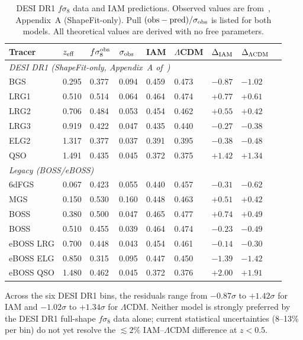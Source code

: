 \documentclass[12pt,a4paper]{article}
\newcommand{\lcdm}{$\Lambda$CDM}
\begin{document}
\begin{table}[ht]
\centering
\caption{DESI DR1 $f\sigma_8$ data and IAM predictions.
Observed values are from~\citet{DESI2024DR1FS}, Appendix~A (ShapeFit-only).
Pull $({\rm obs} - {\rm pred})/\sigma_{\rm obs}$ is listed for both models.
All theoretical values are derived with no free parameters.}
\label{tab:fsig8_full}
\begin{tabular}{lllllllll}
\toprule
Tracer & $z_{\rm eff}$ & $f\sigma_8^{\rm obs}$ & $\sigma_{\rm obs}$
  & IAM & $\Lambda$CDM & $\Delta_{\rm IAM}$ & $\Delta_{\rm \Lambda CDM}$\\
\midrule
\multicolumn{8}{l}{\textit{DESI DR1 (ShapeFit-only, Appendix~A of~\citealt{DESI2024DR1FS})}} \\
BGS   & 0.295 & 0.377 & 0.094 & 0.459 & 0.473 & $-0.87$ & $-1.02$ \\
LRG1  & 0.510 & 0.514 & 0.064 & 0.464 & 0.474 & $+0.77$ & $+0.61$ \\
LRG2  & 0.706 & 0.484 & 0.053 & 0.454 & 0.462 & $+0.55$ & $+0.42$ \\
LRG3  & 0.919 & 0.422 & 0.047 & 0.435 & 0.440 & $-0.27$ & $-0.38$ \\
ELG2  & 1.317 & 0.377 & 0.037 & 0.391 & 0.395 & $-0.38$ & $-0.48$ \\
QSO   & 1.491 & 0.435 & 0.045 & 0.372 & 0.375 & $+1.42$ & $+1.34$ \\
\midrule
\multicolumn{8}{l}{\textit{Legacy (BOSS/eBOSS)}} \\
6dFGS & 0.067 & 0.423 & 0.055 & 0.440 & 0.457 & $-0.31$ & $-0.62$ \\
MGS   & 0.150 & 0.530 & 0.160 & 0.448 & 0.463 & $+0.51$ & $+0.42$ \\
BOSS  & 0.380 & 0.500 & 0.047 & 0.465 & 0.477 & $+0.74$ & $+0.49$ \\
BOSS  & 0.510 & 0.455 & 0.039 & 0.464 & 0.474 & $-0.23$ & $-0.49$ \\
eBOSS LRG & 0.700 & 0.448 & 0.043 & 0.454 & 0.461 & $-0.14$ & $-0.30$ \\
eBOSS ELG & 0.850 & 0.315 & 0.095 & 0.447 & 0.450 & $-1.39$ & $-1.42$ \\
eBOSS QSO & 1.480 & 0.462 & 0.045 & 0.372 & 0.376 & $+2.00$ & $+1.91$ \\
\bottomrule
\end{tabular}
\end{table}

\noindent
Across the six DESI DR1 bins, the residuals range from $-0.87\sigma$ to
$+1.42\sigma$ for IAM and $-1.02\sigma$ to $+1.34\sigma$ for \lcdm{}.
Neither model is strongly preferred by the DESI DR1 full-shape $f\sigma_8$
data alone; current statistical uncertainties (8--13\% per bin) do not
yet resolve the $\lesssim 2\%$ IAM--\lcdm{} difference at $z < 0.5$.
\end{document}
